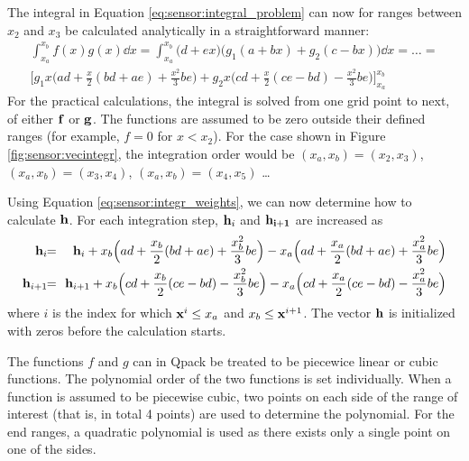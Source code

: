  The integral in Equation \ref{eq:sensor:integral_problem} can now for
 ranges between $x_2$ and $x_3$ be calculated analytically in a
 straightforward manner:
 \begin{eqnarray}
    \int_{x_a}^{x_b}{f(x)g(x) \dd x} =
    \int_{x_a}^{x_b}{\big(d+ex\big)\big(g_1(a+bx)+g_2(c-bx)\big) \dd x}  
    =\dots= \nonumber\\
    \bigg[ g_1x\Big(ad+\frac{x}{2}(bd+ae)+\frac{x^2}{3}be\Big) + 
           g_2x\Big(cd+\frac{x}{2}(ce-bd)-\frac{x^2}{3}be \Big)
           \bigg]_{x_a}^{x_b}
    \label{eq:sensor:integr_weights}
 \end{eqnarray}
 For the practical calculations, the integral is solved from one grid
 point to next, of either $\mathbf{f}$ or $\mathbf{g}$. The functions are 
 assumed to be zero outside their defined ranges (for example, $f=0$ 
 for $x<x_2$).
 For the case
 shown in Figure \ref{fig:sensor:vecintegr}, the integration order would be
 $(x_a,x_b)=(x_2,x_3)$, $(x_a,x_b)=(x_3,x_4)$, $(x_a,x_b)=(x_4,x_5)$
 \ldots\
  
 Using Equation \ref{eq:sensor:integr_weights}, we can now determine how to
 calculate $\mathbf{h}$. For each integration step, $\mathbf{h}_i$ and
 $\mathbf{h_{i+1}}$ are increased as
 \begin{eqnarray}
    \mat{h}_i \!\! &=& \!\! \mat{h}_i +    
              x_b\Big(ad+\frac{x_b}{2}(bd+ae)+\frac{x_b^2}{3}be\Big) - 
              x_a\Big(ad+\frac{x_a}{2}(bd+ae)+\frac{x_a^2}{3}be\Big) 
    \nonumber \\
    \mat{h}_{i+1} \!\! &=& \!\! \mat{h}_{i+1} +
              x_b\Big(cd+\frac{x_b}{2}(ce-bd)-\frac{x_b^2}{3}be\Big) - 
              x_a\Big(cd+\frac{x_a}{2}(ce-bd)-\frac{x_a^2}{3}be\Big) 
    \nonumber
 \end{eqnarray}
 where $i$ is the index for which $\mathbf{x}^i \leq x_a$ and $x_b \leq
 \mathbf{x}^{i+1}$. The vector $\mathbf{h}$ is initialized with
 zeros before the calculation starts.


 \label{sec:sensor:integr:practical}
 
 The functions $f$ and $g$ can in Qpack be treated to be piecewice
 linear or cubic functions. The polynomial order of the two functions
 is set individually. When a function is assumed to be piecewise
 cubic, two points on each side of the range of interest (that is, in
 total 4 points) are used to determine the polynomial. For the end
 ranges, a quadratic polynomial is used as there exists only a single
 point on one of the sides. 
 
